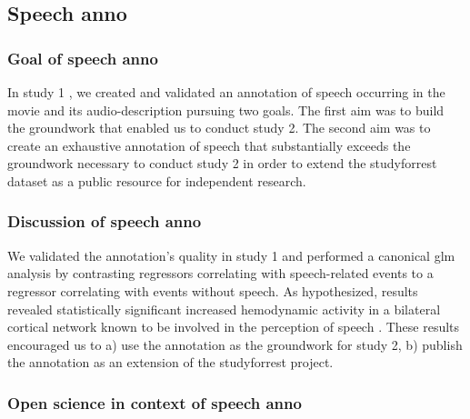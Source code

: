

\subsection{Speech anno}


\subsubsection{Goal of speech anno}

In study 1 \citep{haeusler2021speechanno}, we created and validated an
annotation of speech occurring in the movie and its audio-description pursuing
two goals.
The first aim was to build the groundwork that enabled us to conduct study 2.
The second aim was to create an exhaustive annotation of speech that
substantially exceeds the groundwork necessary to conduct study 2 in order to
extend the studyforrest dataset as a public resource for independent research.


\subsubsection{Discussion of speech anno}

We validated the annotation's quality in study 1 and performed a canonical
\ac{glm} analysis by contrasting regressors correlating with speech-related
events to a regressor correlating with events without speech.
As hypothesized, results revealed statistically significant increased
hemodynamic activity in a bilateral cortical network known to be involved in the
perception of speech \citep[e.g.,][]{friederici2011brain, wilson2008beyond}.
These results encouraged us to a) use the annotation as the groundwork for study
2, b) publish the annotation as an extension of the studyforrest project.


\subsubsection{Open science in context of speech anno}



